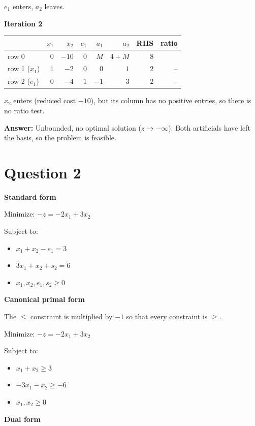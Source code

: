 \documentclass{article}
\begin{document}
$e_1$ enters, $a_2$ leaves.

\textbf{Iteration 2}

\begin{center}
\begin{tabular}{lrrrrrrr}
\toprule
 & $x_1$ & $x_2$ & $e_1$ & $a_1$ & $a_2$ & RHS & ratio \\
\midrule
row 0 & $0$ & $-10$ & $0$ & $M$ & $4+M$ & $8$ &  \\
row 1 ($x_1$) & $1$ & $-2$ & $0$ & $0$ & $1$ & $2$ & -- \\
row 2 ($e_1$) & $0$ & $-4$ & $1$ & $-1$ & $3$ & $2$ & -- \\
\bottomrule
\end{tabular}
\end{center}

$x_2$ enters (reduced cost $-10$), but its column has no positive entries, so there is no ratio test.

\textbf{Answer:} Unbounded, no optimal solution ($z \to -\infty$). Both artificials have left the basis, so the problem is feasible.

\section*{Question 2}
\textbf{Standard form}

Minimize: $-z = -2x_1 + 3x_2$

Subject to:
\begin{itemize}
    \item $x_1 + x_2 - e_1 = 3$
    \item $3x_1 + x_2 + s_2 = 6$
    \item $x_1, x_2, e_1, s_2 \ge 0$
\end{itemize}

\textbf{Canonical primal form}

The $\le$ constraint is multiplied by $-1$ so that every constraint is $\ge$.

Minimize: $-z = -2x_1 + 3x_2$

Subject to:
\begin{itemize}
    \item $x_1 + x_2 \ge 3$
    \item $-3x_1 - x_2 \ge -6$
    \item $x_1, x_2 \ge 0$
\end{itemize}

\textbf{Dual form}
\end{document}
